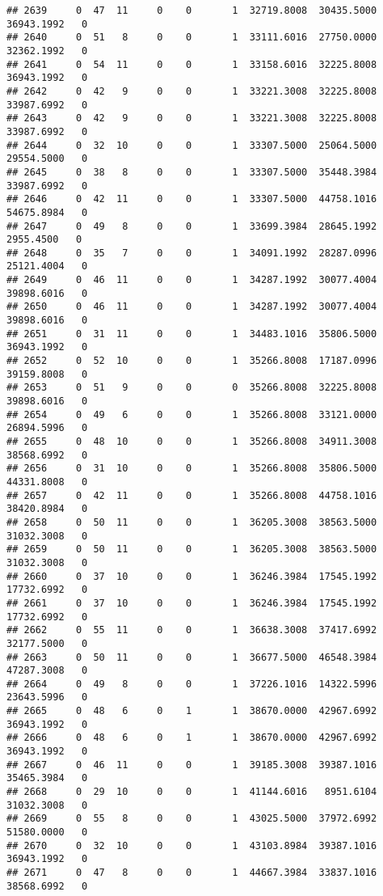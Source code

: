 \documentclass[
]{article}
\begin{document}
\begin{enumerate}
\begin{verbatim}
## 2639     0  47  11     0    0       1  32719.8008  30435.5000  36943.1992   0
## 2640     0  51   8     0    0       1  33111.6016  27750.0000  32362.1992   0
## 2641     0  54  11     0    0       1  33158.6016  32225.8008  36943.1992   0
## 2642     0  42   9     0    0       1  33221.3008  32225.8008  33987.6992   0
## 2643     0  42   9     0    0       1  33221.3008  32225.8008  33987.6992   0
## 2644     0  32  10     0    0       1  33307.5000  25064.5000  29554.5000   0
## 2645     0  38   8     0    0       1  33307.5000  35448.3984  33987.6992   0
## 2646     0  42  11     0    0       1  33307.5000  44758.1016  54675.8984   0
## 2647     0  49   8     0    0       1  33699.3984  28645.1992   2955.4500   0
## 2648     0  35   7     0    0       1  34091.1992  28287.0996  25121.4004   0
## 2649     0  46  11     0    0       1  34287.1992  30077.4004  39898.6016   0
## 2650     0  46  11     0    0       1  34287.1992  30077.4004  39898.6016   0
## 2651     0  31  11     0    0       1  34483.1016  35806.5000  36943.1992   0
## 2652     0  52  10     0    0       1  35266.8008  17187.0996  39159.8008   0
## 2653     0  51   9     0    0       0  35266.8008  32225.8008  39898.6016   0
## 2654     0  49   6     0    0       1  35266.8008  33121.0000  26894.5996   0
## 2655     0  48  10     0    0       1  35266.8008  34911.3008  38568.6992   0
## 2656     0  31  10     0    0       1  35266.8008  35806.5000  44331.8008   0
## 2657     0  42  11     0    0       1  35266.8008  44758.1016  38420.8984   0
## 2658     0  50  11     0    0       1  36205.3008  38563.5000  31032.3008   0
## 2659     0  50  11     0    0       1  36205.3008  38563.5000  31032.3008   0
## 2660     0  37  10     0    0       1  36246.3984  17545.1992  17732.6992   0
## 2661     0  37  10     0    0       1  36246.3984  17545.1992  17732.6992   0
## 2662     0  55  11     0    0       1  36638.3008  37417.6992  32177.5000   0
## 2663     0  50  11     0    0       1  36677.5000  46548.3984  47287.3008   0
## 2664     0  49   8     0    0       1  37226.1016  14322.5996  23643.5996   0
## 2665     0  48   6     0    1       1  38670.0000  42967.6992  36943.1992   0
## 2666     0  48   6     0    1       1  38670.0000  42967.6992  36943.1992   0
## 2667     0  46  11     0    0       1  39185.3008  39387.1016  35465.3984   0
## 2668     0  29  10     0    0       1  41144.6016   8951.6104  31032.3008   0
## 2669     0  55   8     0    0       1  43025.5000  37972.6992  51580.0000   0
## 2670     0  32  10     0    0       1  43103.8984  39387.1016  36943.1992   0
## 2671     0  47   8     0    0       1  44667.3984  33837.1016  38568.6992   0

\end{verbatim}
\end{enumerate}
\end{document}
